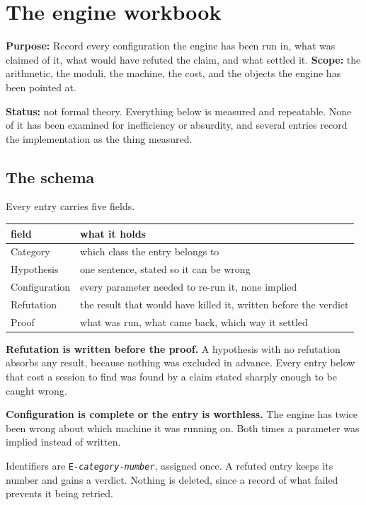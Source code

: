 \chapter{The engine workbook}

\textbf{Purpose:} Record every configuration the engine has been run in, what was claimed of it, what would have refuted the claim, and what settled it. \textbf{Scope:} the arithmetic, the moduli, the machine, the cost, and the objects the engine has been pointed at.

\textbf{Status:} not formal theory. Everything below is measured and repeatable. None of it has been examined for inefficiency or absurdity, and several entries record the implementation as the thing measured.

\section{The schema}

Every entry carries five fields.

\begin{center}
\begin{tabular}{@{}ll@{}}
\toprule
field & what it holds \\
\midrule
Category & which class the entry belongs to \\
Hypothesis & one sentence, stated so it can be wrong \\
Configuration & every parameter needed to re-run it, none implied \\
Refutation & the result that would have killed it, written before the verdict \\
Proof & what was run, what came back, which way it settled \\
\bottomrule
\end{tabular}
\end{center}

\textbf{Refutation is written before the proof.} A hypothesis with no refutation absorbs any result, because nothing was excluded in advance. Every entry below that cost a session to find was found by a claim stated sharply enough to be caught wrong.

\textbf{Configuration is complete or the entry is worthless.} The engine has twice been wrong about which machine it was running on. Both times a parameter was implied instead of written.

Identifiers are \texttt{E-\textit{category}-\textit{number}}, assigned once. A refuted entry keeps its number and gains a verdict. Nothing is deleted, since a record of what failed prevents it being retried.

